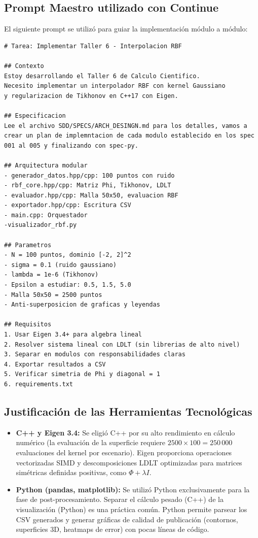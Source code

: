 \documentclass[12pt,a4paper]{article}
\theoremstyle{definition}
\begin{document}
\subsection{Prompt Maestro utilizado con Continue}

El siguiente prompt se utiliz\'{o} para guiar la implementaci\'{o}n m\'{o}dulo a m\'{o}dulo:

\begin{lstlisting}[caption={Prompt maestro para Continue en VSCode.}, label={lst:prompt}]
# Tarea: Implementar Taller 6 - Interpolacion RBF

## Contexto
Estoy desarrollando el Taller 6 de Calculo Cientifico.
Necesito implementar un interpolador RBF con kernel Gaussiano
y regularizacion de Tikhonov en C++17 con Eigen.

## Especificacion
Lee el archivo SDD/SPECS/ARCH_DESINGN.md para los detalles, vamos a crear un plan de implemntacion de cada modulo establecido en los spec 001 al 005 y finalizando con spec-py.

## Arquitectura modular
- generador_datos.hpp/cpp: 100 puntos con ruido
- rbf_core.hpp/cpp: Matriz Phi, Tikhonov, LDLT
- evaluador.hpp/cpp: Malla 50x50, evaluacion RBF
- exportador.hpp/cpp: Escritura CSV
- main.cpp: Orquestador
-visualizador_rbf.py

## Parametros
- N = 100 puntos, dominio [-2, 2]^2
- sigma = 0.1 (ruido gaussiano)
- lambda = 1e-6 (Tikhonov)
- Epsilon a estudiar: 0.5, 1.5, 5.0
- Malla 50x50 = 2500 puntos
- Anti-superposicion de graficas y leyendas

## Requisitos
1. Usar Eigen 3.4+ para algebra lineal
2. Resolver sistema lineal con LDLT (sin librerias de alto nivel)
3. Separar en modulos con responsabilidades claras
4. Exportar resultados a CSV
5. Verificar simetria de Phi y diagonal = 1
6. requirements.txt
\end{lstlisting}

\subsection{Justificaci\'{o}n de las Herramientas Tecnol\'{o}gicas}

\begin{itemize}
    \item \textbf{C++ y Eigen 3.4:} Se eligi\'{o} C++ por su alto rendimiento en c\'{a}lculo num\'{e}rico (la evaluaci\'{o}n de la superficie requiere $2500 \times 100 = 250\,000$ evaluaciones del kernel por escenario). Eigen proporciona operaciones vectorizadas SIMD y descomposiciones LDLT optimizadas para matrices sim\'{e}tricas definidas positivas, como $\Phi + \lambda I$.
    
    \item \textbf{Python (pandas, matplotlib):} Se utiliz\'{o} Python exclusivamente para la fase de post-procesamiento. Separar el c\'{a}lculo pesado (C++) de la visualizaci\'{o}n (Python) es una pr\'{a}ctica com\'{u}n. Python permite parsear los CSV generados y generar gr\'{a}ficas de calidad de publicaci\'{o}n (contornos, superficies 3D, heatmaps de error) con pocas l\'{i}neas de c\'{o}digo.
\end{itemize}
\end{document}
